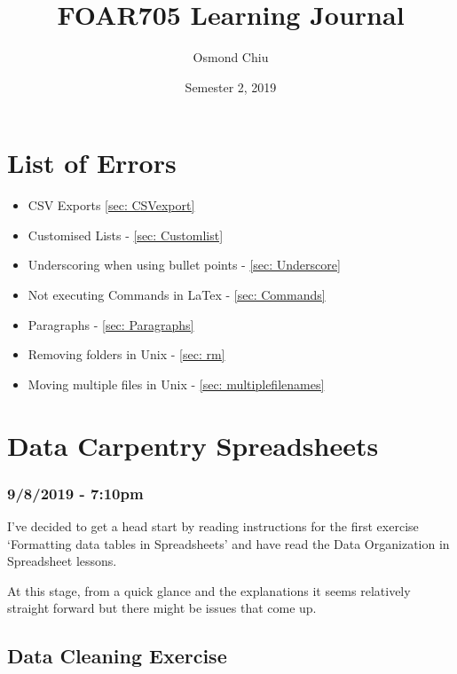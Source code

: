 \documentclass{article}
\title{FOAR705 Learning Journal}
\author{Osmond Chiu}
\date{Semester 2, 2019}
\begin{document}
\maketitle
\tableofcontents
\newpage

\section{List of Errors}\par
\begin{itemize}
    \item CSV Exports \ref{sec: CSVexport}
    \item Customised Lists - \ref{sec: Customlist}
    \item Underscoring when using bullet points - \ref{sec: Underscore}
    \item Not executing Commands in LaTex - \ref{sec: Commands}
    \item Paragraphs - \ref{sec: Paragraphs}\par
    \item Removing folders in Unix - \ref{sec: rm}\par
    \item Moving multiple files in Unix - \ref{sec: multiplefilenames}\par
\end{itemize}



\par


\newpage
\section{Data Carpentry Spreadsheets}
\subsubsection*{9/8/2019 - 7:10pm}
I’ve decided to get a head start by reading instructions for the first exercise ‘Formatting data tables in Spreadsheets’ and have read the Data Organization in Spreadsheet lessons.\par
At this stage, from a quick glance and the explanations it seems relatively straight forward but there might be issues that come up.\par
\subsection{Data Cleaning Exercise}
\end{document}
